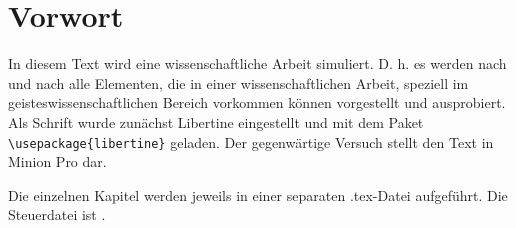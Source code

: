 \chapter*{Vorwort}
\label{cha:vorwort}
In diesem Text wird eine wissenschaftliche Arbeit simuliert. D. h. es werden nach und nach alle Elementen, die in einer wissenschaftlichen Arbeit, speziell im geisteswissenschaftlichen Bereich vorkommen können vorgestellt und ausprobiert. Als Schrift wurde zunächst Libertine eingestellt und mit dem Paket \verb*+\usepackage{libertine}+ geladen. Der gegenwärtige Versuch stellt den Text in Minion Pro dar.

Die einzelnen Kapitel werden jeweils in einer separaten .tex-Datei aufgeführt. Die Steuerdatei ist . 